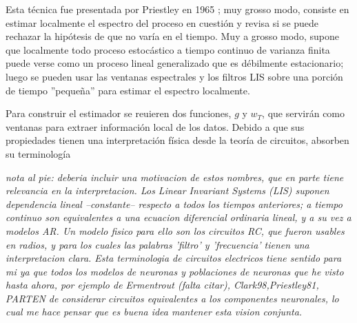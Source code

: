 Esta t\'ecnica fue presentada por Priestley en 1965 \cite{Priestley69}; 
muy grosso modo, consiste en estimar localmente  el espectro
del proceso en cuesti\'on y revisa si se puede rechazar la hip\'otesis de que no
var\'ia en el tiempo.
%
Muy a grosso modo, supone que localmente todo proceso estoc\'astico a tiempo continuo de varianza 
finita puede verse como un proceso lineal generalizado que es d\'ebilmente estacionario;
luego se pueden usar las ventanas espectrales y los filtros LIS sobre una porci\'on 
de tiempo ''peque\~na'' para estimar el espectro localmente.




Para construir el estimador se reuieren dos funciones, $g$ y $w_T$, que servir\'an como ventanas
para extraer informaci\'on local de los datos. Debido a que sus propiedades tienen una interpretaci\'on
f\'isica desde la teor\'ia de circuitos, absorben su terminolog\'ia

\textit{
nota al pie: deberia incluir una motivacion de estos nombres,
que en parte tiene relevancia en la interpretacion. Los 
Linear Invariant Systems (LIS) suponen dependencia lineal
--constante-- respecto a todos los tiempos anteriores; 
a tiempo continuo son equivalentes a una ecuacion diferencial ordinaria lineal,
y a su vez a modelos AR. Un modelo fisico para ello son los circuitos RC, que
fueron usables en radios, y para los cuales las palabras 'filtro' y 'frecuencia'
tienen una interpretacion clara. Esta terminologia de circuitos electricos tiene sentido
para mi ya que todos los modelos de neuronas y poblaciones de neuronas que he visto hasta ahora,
por ejemplo de Ermentrout (falta citar), {Clark98,Priestley81}, PARTEN de considerar
circuitos equivalentes a los componentes neuronales, lo cual me hace pensar que es buena idea
mantener esta vision conjunta.
}

